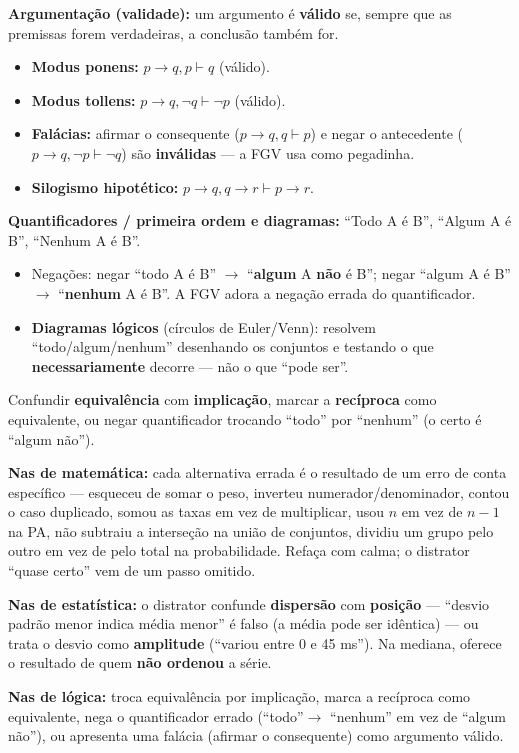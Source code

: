 \textbf{Argumentação (validade):} um argumento é \textbf{válido} se, sempre
que as premissas forem verdadeiras, a conclusão também for.

\begin{itemize}
\item \textbf{Modus ponens:} $p \to q, p \vdash q$ (válido).
\item \textbf{Modus tollens:} $p \to q, \lnot q \vdash \lnot p$ (válido).
\item \textbf{Falácias:} afirmar o consequente ($p \to q, q \vdash p$) e
negar o antecedente ($p \to q, \lnot p \vdash \lnot q$) são
\textbf{inválidas} --- a FGV usa como pegadinha.
\item \textbf{Silogismo hipotético:} $p \to q, q \to r \vdash p \to r$.
\end{itemize}

\textbf{Quantificadores / primeira ordem e diagramas:} ``Todo A é B'',
``Algum A é B'', ``Nenhum A é B''.

\begin{itemize}
\item Negações: negar ``todo A é B'' $\to$ ``\textbf{algum} A \textbf{não} é
B''; negar ``algum A é B'' $\to$ ``\textbf{nenhum} A é B''. A FGV adora a
negação errada do quantificador.
\item \textbf{Diagramas lógicos} (círculos de Euler/Venn): resolvem
``todo/algum/nenhum'' desenhando os conjuntos e testando o que
\textbf{necessariamente} decorre --- não o que ``pode ser''.
\end{itemize}

\begin{pegadinha}
Confundir \textbf{equivalência} com \textbf{implicação}, marcar a
\textbf{recíproca} como equivalente, ou negar quantificador trocando ``todo''
por ``nenhum'' (o certo é ``algum não'').
\end{pegadinha}

\begin{pegadinha}
\textbf{Nas de matemática:} cada alternativa errada é o resultado de um erro
de conta específico --- esqueceu de somar o peso, inverteu
numerador/denominador, contou o caso duplicado, somou as taxas em vez de
multiplicar, usou $n$ em vez de $n-1$ na PA, não subtraiu a interseção na
união de conjuntos, dividiu um grupo pelo outro em vez de pelo total na
probabilidade. Refaça com calma; o distrator ``quase certo'' vem de um passo
omitido.

\textbf{Nas de estatística:} o distrator confunde \textbf{dispersão} com
\textbf{posição} --- ``desvio padrão menor indica média menor'' é falso (a
média pode ser idêntica) --- ou trata o desvio como \textbf{amplitude}
(``variou entre 0 e 45 ms''). Na mediana, oferece o resultado de quem
\textbf{não ordenou} a série.

\textbf{Nas de lógica:} troca equivalência por implicação, marca a
recíproca como equivalente, nega o quantificador errado (``todo''$\to$
``nenhum'' em vez de ``algum não''), ou apresenta uma falácia (afirmar o
consequente) como argumento válido.
\end{pegadinha}

